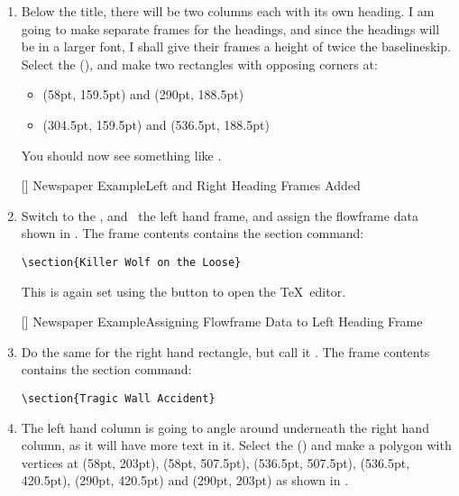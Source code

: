 \begin{enumerate}
\item Below the title, there will be two columns each with its
own heading. I am going to make separate frames for the headings,
and since the headings will be in a larger font, I shall give their
frames a height of twice the \gls{baselineskip}. Select the
 (), and make two
rectangles with opposing corners at:
\begin{itemize}
\item (58pt, 159.5pt) and (290pt, 188.5pt)
\item (304.5pt, 159.5pt) and (536.5pt, 188.5pt)
\end{itemize}
You should now see something like .

[]
{}
{Newspaper Example\dash Left and Right Heading Frames Added}

\item Switch to the , and
\select\ the left hand frame, and assign the \gls{flowframe} data shown in
. The frame contents contains the section
command:
\begin{verbatim}
\section{Killer Wolf on the Loose}
\end{verbatim}
This is again set using the  button
to open the \TeX\ editor.

[]
{}
{Newspaper Example\dash Assigning Flowframe Data to Left
Heading Frame}

\item Do the same for the right hand rectangle, but
call it . The frame contents contains the
section command:
\begin{verbatim}
\section{Tragic Wall Accident}
\end{verbatim}

\item The left hand column is going to angle around underneath the
right hand column, as it will have more text in it. Select the
 () and make a
polygon with vertices at (58pt, 203pt), (58pt, 507.5pt), (536.5pt,
507.5pt), (536.5pt, 420.5pt), (290pt, 420.5pt) and (290pt, 203pt) as
shown in .


\end{enumerate}
